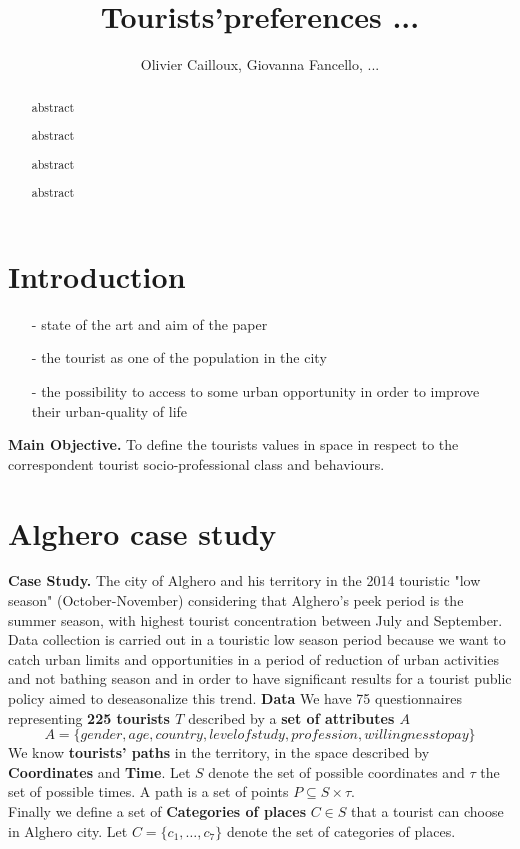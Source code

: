 \documentclass[a4paper]{article}
\author{Olivier Cailloux, Giovanna Fancello, ...}
\title{Tourists'preferences ...}
\begin{document}
\maketitle
\begin{abstract}
abstract

abstract

abstract

abstract
\end{abstract}

\tableofcontents


\section{Introduction}
\begin{itemize}
   \item [-]state of the art and aim of the paper
   \item [-]the tourist as one of the population in the city
   \item [-]the possibility to access to some urban opportunity in order to improve their urban-quality of life
 \end{itemize}
\textbf{Main Objective.}
To define the tourists values in space in respect to the correspondent tourist socio-professional class and behaviours.

\section{Alghero case study}

\textbf{Case Study.}
The city of Alghero and his territory in the 2014 touristic "low season" (October-November) considering that Alghero's peek period is the summer season, with highest tourist concentration between July and September. Data collection is carried out in a touristic low season period because we want to catch urban limits and opportunities in a period of reduction of urban activities and not bathing season and in order to have significant results for a tourist public policy aimed to deseasonalize this trend.
\textbf{Data}
We have 75 questionnaires representing \textbf{225 tourists $T$} described by a \textbf{set of attributes $A$}
\begin{equation}
A=\{gender,age,country,level of study,profession,willingness to pay\}
\end{equation}
We know \textbf{tourists' paths} in the territory, in the space described by \textbf{Coordinates} and \textbf{Time}.
Let $S$ denote the set of possible coordinates and $\tau$ the set of possible times.  A path is a set of points $P \subseteq S \times \tau$.\\
Finally we define a set of \textbf{Categories of places} $C \in S$ that a tourist can choose in Alghero city.
Let $C=\{c_1, \ldots, c_7\}$ denote the set of categories of places.
\end{document}
